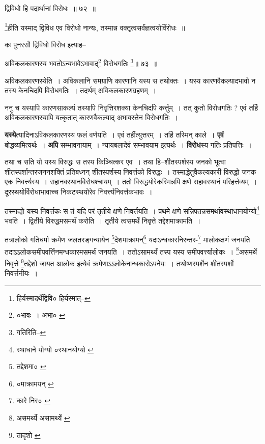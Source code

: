 \documentclass[article,12pt,a4paper]{memoir}
\begin{document}
	  \bigskip
	  \begingroup
	

	  \pstart द्विविधो हि पदार्थानां विरोधः ॥ ७२ ॥
	\pend
      
	  \endgroup
	 

	  \pstart \footnote{हिर्यस्मादर्थेद्विवि० \cite{dp-msD} हिर्यस्मात्--\cite{dp-msB}}हीति यस्माद् द्विविध एव विरोधो नान्यः, तस्मान्न वक्तृत्वसर्वंज्ञत्वयोर्विंरोधः ॥
	\pend
       

	  \pstart कः पुनरसौ द्विविधो विरोध इत्याह--
	\pend
       
	  \bigskip
	  \begingroup
	

	  \pstart अविकलकारणस्य भवतोऽन्यभावेऽभावाद्\footnote{०भावः । अभा० \cite{dp-msB} \cite{dp-edP} \cite{dp-edH}} विरोधगतिः \footnote{गतिरिति--\cite{dp-msC}}॥ ७३ ॥
	\pend
      
	  \endgroup
	 

	  \pstart अविकलकारणस्येति । अविकलानि समग्राणि कारणानि यस्य स तथोक्तः । यस्य कारणवैकल्यादभावो न तस्य केनचिदपि विरोधगतिः । तदर्थम् अविकलकारणग्रहणम् ।
	\pend
       

	  \pstart ननु च यस्यापि कारणसाकल्यं तस्यापि निवृत्तिरशक्या केनचिदपि कर्त्तुम् । तत् कुतो विरोधगतिः ? एवं तर्हि अविकलकारणस्यापि यत्कृतात् कारणवैकल्याद् अभावस्तेन विरोधगतिः ।
	\pend
      
	  \endgroup
	

	  \pstart \textbf{यस्ये}त्यादिनाऽविकलकारणस्य फलं वर्णयति । एवं तर्हीत्युत्तरम् । तर्हि तस्मिन् काले । \textbf{एवं} बोद्धव्यमित्यर्थः । \textbf{अपि} सम्भावनायाम् । न्यायबलादेवं सम्भावयाम इत्यर्थः । \textbf{विरोध}स्य गतिः प्रतिपत्तिः ।
	\pend
      \leavevmode{}
	  \bigskip
	  \begingroup
	

	  \pstart तथा च सति यो यस्य विरुद्धः स तस्य किञ्चित्कर एव । तथा हि--शीतस्पर्शस्य जनको भूत्वा शीतस्पर्शान्तरजननशक्तिं प्रतिबध्नन् शीतस्पर्शस्य निवर्त्तको विरुद्धः । तस्माद्धेतुवैकल्यकारी विरुद्धो जनक एक निवर्त्त्यस्य । सहानवस्थानविरोधश्चायम् । ततो विरुद्धयोरेकस्मिन्नपि क्षणे सहावस्थानं परिहर्त्तव्यम् । दूरस्थयोर्विरोधाभावाच्च निकटस्थयोरेव निवर्त्त्यनिवर्त्तकभावः ।
	\pend
       

	  \pstart तस्माद्यो यस्य निवर्त्तकः स तं यदि परं तृतीये क्षणे निवर्त्तयति । प्रथमे क्षणे सन्निपतन्नसमर्थावस्थाधानयोग्यो\footnote{स्थाधाने योग्यो \cite{dp-msD} ०स्थानयोग्यो \cite{dp-msA} \cite{dp-msB} \cite{dp-edP} \cite{dp-edH} \cite{dp-edE}} भवति । द्वितीये विरुद्धमसमर्थं करोति । तृतीये त्वसमर्थे निवृत्ते तद्देशमाक्रामति ।
	\pend
       

	  \pstart तत्रालोको गतिधर्मा क्रमेण जलतरङ्गन्यायेन \footnote{तद्देशमा० \cite{dp-msC} \cite{dp-msD}}देशमाक्रामन्\footnote{०माक्रामयन् \cite{dp-msB} \cite{dp-edN}} यदाऽन्धकारनिरन्तर-\footnote{कारे निर० \cite{dp-msA} \cite{dp-msB} \cite{dp-edP} \cite{dp-edH} \cite{dp-edE} \cite{dp-edN}} मालोकक्षणं जनयति तदाऽऽलोकसमीपवर्त्तिनमन्धकारमसमर्थं जनयति । ततोऽसामर्थ्यं तस्प यस्य समीपवर्त्त्यालोकः । \footnote{असमर्थ्ये \cite{dp-msA} असामर्थ्ये \cite{dp-edP} \cite{dp-edH} \cite{dp-edE} \cite{dp-edN}}असमर्थे निवृत्ते \footnote{तादृशो \cite{dp-msA} \cite{dp-msB} \cite{dp-edP} \cite{dp-edH} \cite{dp-edN}}तद्देशो जायत आलोक इत्येवं क्रमेणाऽऽलोकेनान्धकारोऽपनेयः । तथोष्णस्पर्शेन शीतस्पर्शो निवर्त्तनीयः ।
	\pend
      
\end{document}
